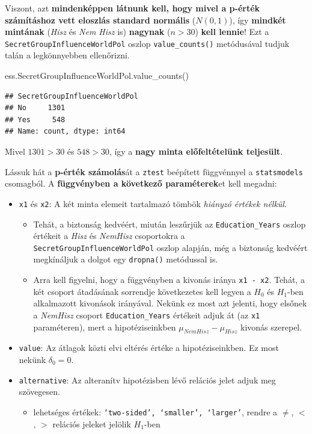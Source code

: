 \documentclass[
]{book}
\newenvironment{Shaded}{\begin{snugshade}}{\end{snugshade}}
\newcommand{\NormalTok}[1]{#1}
\providecommand{\tightlist}{%
  \setlength{\itemsep}{0pt}\setlength{\parskip}{0pt}}
\begin{document}
Viszont, azt \textbf{mindenképpen látnunk kell, hogy mivel a p-érték számításhoz vett eloszlás standard normális} (\(N(0,1)\)), így \textbf{mindkét mintának} (\emph{Hisz} és \emph{Nem Hisz} is) \textbf{nagynak} (\(n>30\)) \textbf{kell lennie}!
Ezt a \texttt{SecretGroupInfluenceWorldPol} oszlop \texttt{value\_counts()} metódusával tudjuk talán a legkönnyebben ellenőrizni.

\begin{Shaded}
\begin{Highlighting}[]
\NormalTok{ess.SecretGroupInfluenceWorldPol.value\_counts()}
\end{Highlighting}
\end{Shaded}

\begin{verbatim}
## SecretGroupInfluenceWorldPol
## No     1301
## Yes     548
## Name: count, dtype: int64
\end{verbatim}

Mivel \(1301>30\) és \(548>30\), így a \textbf{nagy minta előfeltételünk teljesült}.

Lássuk hát a \textbf{p-érték számolás}át a \texttt{ztest} beépített függvénnyel a \texttt{statsmodels} csomagból.
A \textbf{függvényben a következő paraméterek}et kell megadni:

\begin{itemize}
\tightlist
\item
  \texttt{x1} és \texttt{x2}: A két minta elemeit tartalmazó tömbök \emph{hiányzó értékek nélkül}.

  \begin{itemize}
  \tightlist
  \item
    Tehát, a biztonság kedvéért, miután leszűrjük az \texttt{Education\_Years} oszlop értékeit a \emph{Hisz} és \emph{NemHisz} csoportokra a \texttt{SecretGroupInfluenceWorldPol} oszlop alapján, még a biztonság kedvéért megkínáljuk a dolgot egy \texttt{dropna()} metódussal is.
  \item
    Arra kell figyelni, hogy a függvényben a kivonás iránya \texttt{x1\ -\ x2}. Tehát, a két csoport átadásának sorrendje következetes kell legyen a \(H_0\) és \(H_1\)-ben alkalmazott kivonások irányával. Nekünk ez most azt jelenti, hogy elsőnek a \emph{NemHisz} csoport \texttt{Education\_Years} értékeit adjuk át (az \texttt{x1} paraméteren), mert a hipotéziseinkben \(\mu_{NemHisz} - \mu_{Hisz}\) kivonás szerepel.
  \end{itemize}
\item
  \texttt{value}: Az átlagok közti elvi eltérés értéke a hipotéziseinkben. Ez most nekünk \(\delta_0=0\).
\item
  \texttt{alternative}: Az alteranítv hipotézisben lévő relációs jelet adjuk meg szövegesen.

  \begin{itemize}
  \tightlist
  \item
    lehetséges értékek: \texttt{‘two-sided’,\ ‘smaller’,\ ‘larger’}, rendre a \(\neq\), \(<\), \(>\) relációs jeleket jelölik \(H_1\)-ben
  \end{itemize}
\end{itemize}
\end{document}
